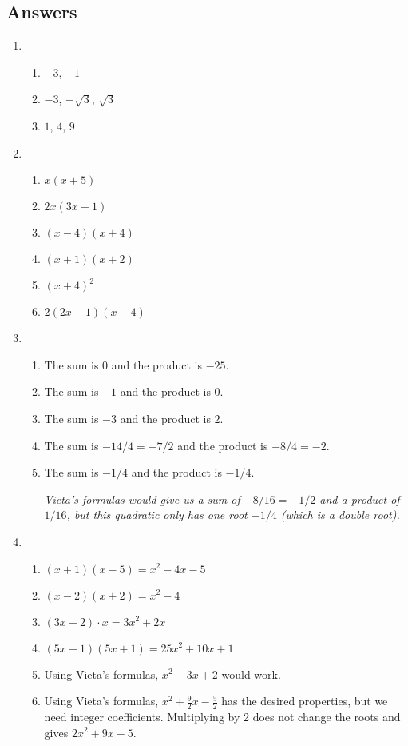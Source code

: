 \newpage
\subsection{Answers}

\begin{enumerate}
\item \begin{enumerate}
\item $-3$, $-1$
\item $-3$, $-\sqrt{3}$, $\sqrt{3}$
\item $1$, $4$, $9$
\end{enumerate}
\item \begin{enumerate}
\item $x(x + 5)$
\item $2x(3x + 1)$
\item $(x - 4)(x + 4)$
\item $(x + 1)(x + 2)$
\item $(x + 4)^2$
\item $2(2x - 1)(x - 4)$
\end{enumerate}
\item \begin{enumerate}
\item The sum is $0$ and the product is $-25$.
\item The sum is $-1$ and the product is $0$.
\item The sum is $-3$ and the product is $2$.
\item The sum is $-14/4 = -7/2$ and the product is $-8/4 = -2$.
\item The sum is $-1/4$ and the product is $-1/4$.\par
\emph{Vieta's formulas would give us a sum of $-8/16 = -1/2$ and a product of $1/16$, but this quadratic only has one root $-1/4$ (which is a double root).}
\end{enumerate}
\item \begin{enumerate}
\item $(x + 1)(x - 5) = \boxed{x^2 - 4x - 5}$
\item $(x - 2)(x + 2) = \boxed{x^2 - 4}$
\item $(3x + 2)\cdot x = \boxed{3x^2 + 2x}$
\item $(5x + 1)(5x + 1) = \boxed{25x^2 + 10x + 1}$
\item Using Vieta's formulas, $\boxed{x^2 - 3x + 2}$ would work.
\item Using Vieta's formulas, $x^2 + \frac{9}{2}x - \frac{5}{2}$ has the desired properties, but we need integer coefficients. Multiplying by 2 does not change the roots and gives $\boxed{2x^2 + 9x - 5}$.
\end{enumerate}
\end{enumerate}